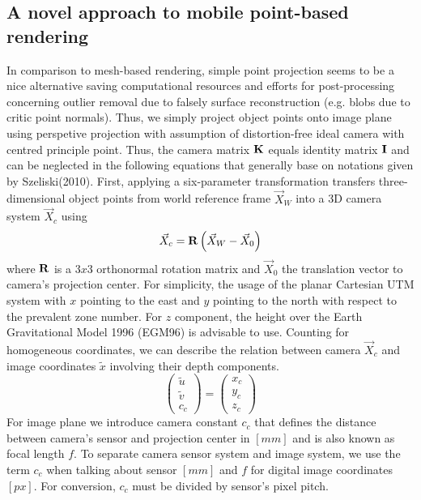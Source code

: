 \documentclass[review]{elsarticle}
\begin{document}
\subsection{A novel approach to mobile point-based rendering}
In comparison to mesh-based rendering, simple point projection seems to be a nice alternative saving computational resources and efforts for post-processing concerning outlier removal due to falsely surface reconstruction (e.g. blobs due to critic point normals). Thus, we simply project object points onto image plane using perspetive projection with assumption of distortion-free ideal camera with centred principle point. Thus, the camera matrix $\bf K$ equals identity matrix $\bf I$ and can be neglected in the following equations that generally base on notations given by Szeliski(2010). 
First, applying a six-parameter transformation transfers three-dimensional object points from world reference frame $\vec{X}_W$ into a 3D camera system $\vec{X}_c $ using
\begin{equation}
\vec{X}_c = {\bf R} \left( \vec{X}_W - \vec{X}_0 \right) 
\label{eq:projection_simple}
\end{equation} 
where $\bf R$ is a $3x3$ orthonormal rotation matrix and $\vec{X}_0 $ the translation vector to camera's projection center. For simplicity, the usage of the planar Cartesian UTM system with $x$ pointing to the east and $y$ pointing to the north with respect to the prevalent zone number. For $z$ component, the height over the Earth Gravitational Model 1996 (EGM96) is advisable to use. 
Counting for homogeneous coordinates, we can describe the relation between camera $\vec{X}_c$ and image coordinates $\tilde{x}$ involving their depth components. 
\begin{equation}
\begin{pmatrix}
\tilde{u} \\
\tilde{v} \\
c_c
\end{pmatrix} =
\begin{pmatrix}
x_c \\
y_c \\
z_c
\end{pmatrix}
\end{equation}
For image plane we introduce camera constant $c_c$ that defines the distance between camera's sensor and projection center in $[mm]$ and is also known as focal length $f$. To separate camera sensor system and image system, we use the term $c_c$ when talking about sensor $[mm]$ and $f$ for digital image coordinates $[px]$. For conversion, $c_c$ must be divided by sensor's pixel pitch.
\end{document}
